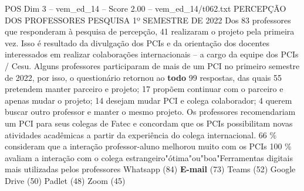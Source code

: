 \begin{textsample}{POS Dim 3 – vem\_ed\_14 – Score 2.00 – vem\_ed\_14/t062.txt}  \label{ex:f3_pos_031}
PERCEPÇÃO DOS PROFESSORES PESQUISA 1º SEMESTRE DE 2022 Dos 83 professores que responderam à pesquisa de percepção, 41 realizaram o projeto pela primeira vez.
Isso é resultado da divulgação dos PCIs e da orientação dos docentes interessados em realizar colaborações internacionais – a cargo da equipe dos PCIs / Cesu.
Alguns professores participaram de mais de um PCI no primeiro semestre de 2022, por isso, o questionário retornou ao \textbf{todo} 99 respostas, das quais 55 pretendem manter parceiro e projeto; 17 propõem continuar com o parceiro e apenas mudar o projeto; 14 desejam mudar PCI e colega colaborador; 4 querem buscar outro professor e manter o mesmo projeto.
Os professores recomendariam um PCI para seus colegas de Fatec e concordam que os PCIs possibilitam novas atividades acadêmicas a partir da experiência do colega internacional. 66 \% consideram que a interação professor-aluno melhorou muito com os PCIs 100 \% avaliam a interação com o colega estrangeiro"ótima"ou"boa"Ferramentas digitais mais utilizadas pelos professores Whatsapp (84) \textbf{E-mail} (73) Teams (52) Google Drive (50) Padlet (48) Zoom (45)

\end{textsample}
